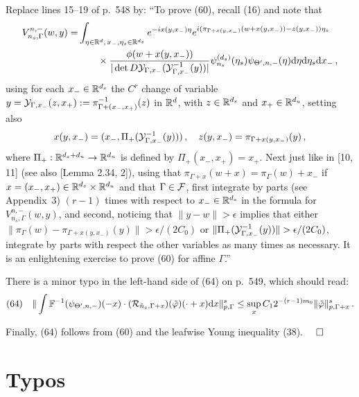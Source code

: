\documentclass[10pt,twoside]{amsart}
\begin{document}
Replace lines 15--19 of p.~548 by:
``To prove (60), recall (16) and note that 
 \begin{align*}
V^{n,-}_{n_s, \Gamma}(w,y)=&\int_{\eta\in \mathbb{R}^{d},\,  x_-, \eta_s\in \mathbb{R}^{d_s}}
e^{-i x(y,x_-)\eta}  
e^{i( \pi_{\Gamma+x(y,x_-)}(w+x(y,x_-))-
z(y, x_-)) \eta_s}
\\
&\qquad  \times
\frac{ \phi(w+x(y,x_-))}{|\det D \mathcal{Y}_{\Gamma, x_-} (\mathcal{Y}_{\Gamma, x_-}^{-1}(y))|}
 \psi_{n_s}^{(d_s)}(\eta_s) \psi_{\Theta', n,-}(\eta)
   \mathrm {d} \eta \mathrm {d} \eta_s  \mathrm {d} x_- \, ,
\end{align*} 
using for each $x_-\in \mathbb{R}^{d_s}$  the $C^r$ change of variable $y=\mathcal{Y}_{\Gamma, x_-}(z,x_+):= \pi_{\Gamma+(x_-,x_+)}^{-1}(z)$
in $\mathbb{R}^d$, with $z\in \mathbb{R}^{d_s}$ and $x_+\in \mathbb{R}^ {d_u}$, 
setting also 
$$
x(y,x_-)= (x_-, \Pi_+(\mathcal{Y}^{-1}_{\Gamma, x_-}(y))) \, , \quad
z(y,x_-)= \pi_{\Gamma+x(y,x_-)} (y)\, ,
$$
where $\Pi_+:\mathbb{R}^{d_s+d_u}\to \mathbb{R}^{d_u}$ is defined by $\Pi_+(x_-, x_+)=x_+$.
Next just like in [10, 11]
(see also [Lemma 2.34, 2]), using that $\pi_{\Gamma+x}(w+x)=\pi_\Gamma(w)+x_-$
if $x=(x_-,x_+)\in \mathbb{R}^{d_s}\times \mathbb{R}^{d_u}$ and that $\Gamma \in \mathcal{F}$, first
integrate by parts (see Appendix~3)
$(r-1)$ times
with respect to $x_-\in \mathbb{R}^{d_s}$ in the
formula for $V^{n,-}_{n_s, \Gamma}(w,y)$, and second, noticing that
$\|y-w\|> \epsilon$ implies that either 
$\|\pi_{\Gamma}(w)-\pi_{\Gamma+x(y,x_-)}(y)\|> \epsilon/(2C_0)$
or $\|\Pi_+(\YY^{-1}_{\Gamma, x_-}(y))\|>\epsilon/(2C_0)$,  integrate
by parts with respect the other variables as many times as necessary. It is an  enlightening exercise to prove (60) for affine
$\Gamma$.''




There is a minor typo in the left-hand side of (64) on p.~549, which should read:
\begin{equation*}
(64)\quad \|\int \mathbb{F}^{-1}(\psi_{\Theta',n,-})(-x)\cdot (\mathcal {R}_{\tilde n_s, \Gamma+x} )(\tilde \varphi)(\cdot+x) \mathrm {d} x  \|^s_{p,\Gamma}
\le \sup_x C_1 2^{-(r-1)m_0} \|\tilde \varphi\|^s_{p, \Gamma+x} \, .
\end{equation*}

Finally,  (64) follows from (60) and the leafwise
 Young inequality (38).$\qed$


\section{Typos}
\end{document}
